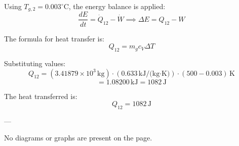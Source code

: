 Using \( T_{g,2} = 0.003^\circ \text{C} \), the energy balance is applied:  
\[
\frac{dE}{dt} = \dot{Q}_{12} - \dot{W} \implies \Delta E = Q_{12} - W
\]  

The formula for heat transfer is:  
\[
Q_{12} = m_g c_V \Delta T
\]  

Substituting values:  
\[
Q_{12} = (3.41879 \times 10^3 \, \text{kg}) \cdot (0.633 \, \text{kJ/(kg·K)}) \cdot (500 - 0.003) \, \text{K}
\]  
\[
= 1.08200 \, \text{kJ} = 1082 \, \text{J}
\]  

The heat transferred is:  
\[
Q_{12} = 1082 \, \text{J}
\]  

---

No diagrams or graphs are present on the page.